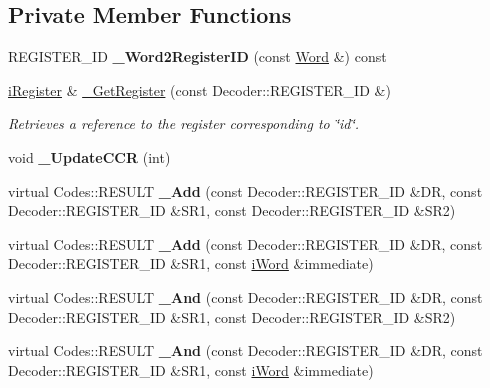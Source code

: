 \subsection*{Private Member Functions}
\begin{DoxyCompactItemize}
\item 
\hypertarget{classWi11_abba9724054093a987468c0b14bf8fcda}{
REGISTER\_\-ID {\bfseries \_\-Word2RegisterID} (const \hyperlink{classWord}{Word} \&) const }
\label{classWi11_abba9724054093a987468c0b14bf8fcda}

\item 
\hyperlink{classiRegister}{iRegister} \& \hyperlink{classWi11_a22228a86b6d5c60c8f403e8fc087077f}{\_\-GetRegister} (const Decoder::REGISTER\_\-ID \&)
\begin{DoxyCompactList}\small\item\em Retrieves a reference to the register corresponding to \char`\"{}id\char`\"{}. \item\end{DoxyCompactList}\item 
\hypertarget{classWi11_a55dd619a7cf329849f5a3b22e37d00ed}{
void {\bfseries \_\-UpdateCCR} (int)}
\label{classWi11_a55dd619a7cf329849f5a3b22e37d00ed}

\item 
\hypertarget{classWi11_a82892426bc10c28481476ee9fdfc163d}{
virtual Codes::RESULT {\bfseries \_\-Add} (const Decoder::REGISTER\_\-ID \&DR, const Decoder::REGISTER\_\-ID \&SR1, const Decoder::REGISTER\_\-ID \&SR2)}
\label{classWi11_a82892426bc10c28481476ee9fdfc163d}

\item 
\hypertarget{classWi11_a858c595ea8ef9c96a13c579e0de5b5e6}{
virtual Codes::RESULT {\bfseries \_\-Add} (const Decoder::REGISTER\_\-ID \&DR, const Decoder::REGISTER\_\-ID \&SR1, const \hyperlink{classiWord}{iWord} \&immediate)}
\label{classWi11_a858c595ea8ef9c96a13c579e0de5b5e6}

\item 
\hypertarget{classWi11_a75d0c6dd25cf3268da64475243b4a622}{
virtual Codes::RESULT {\bfseries \_\-And} (const Decoder::REGISTER\_\-ID \&DR, const Decoder::REGISTER\_\-ID \&SR1, const Decoder::REGISTER\_\-ID \&SR2)}
\label{classWi11_a75d0c6dd25cf3268da64475243b4a622}

\item 
\hypertarget{classWi11_a276affccb92fa84d879ed1b5081247f4}{
virtual Codes::RESULT {\bfseries \_\-And} (const Decoder::REGISTER\_\-ID \&DR, const Decoder::REGISTER\_\-ID \&SR1, const \hyperlink{classiWord}{iWord} \&immediate)}
\label{classWi11_a276affccb92fa84d879ed1b5081247f4}


\end{DoxyCompactItemize}
